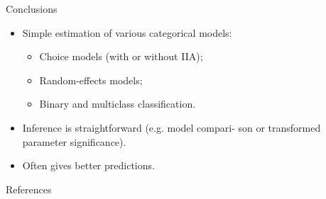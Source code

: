 \documentclass{beamer}
\newlength{\onecolwid}
\newlength{\twocolwid}
\newlength{\threecolwid}
\begin{document}
\begin{frame}[t]
\begin{columns}[t]
\begin{column}{\threecolwid}
\begin{columns}[t,totalwidth=\twocolwid]
\begin{column}{\onecolwid}
\begin{alertblock}{Conclusions}

\begin{itemize}
  \item Simple estimation of various categorical models:
  \begin{itemize}
    \item Choice models (with or without IIA);
    \item Random-effects models;
    \item Binary and multiclass classification.
  \end{itemize}
  \item Inference is straightforward (e.g. model compari- son or transformed parameter significance).
  \item Often gives better predictions.
\end{itemize}

\end{alertblock}



\vspace{-1mm}
\begin{block}{References}

\vspace{-19pt}
\nocite{*}

\small{}

\end{block}

\end{column}
 

 
\end{columns}


\end{column}
\end{columns}
\end{frame}
\end{document}
